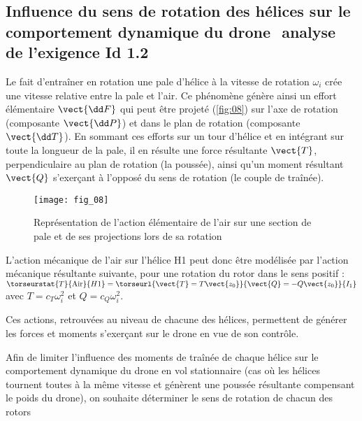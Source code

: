 \ifprof
\begin{corrige}
\end{corrige}
\else
\fi

\subsection{Influence du sens de rotation des hélices sur le comportement dynamique du
drone ­ analyse de l’exigence Id 1.2}

Le fait d’entraîner en rotation une pale d’hélice à la vitesse de rotation $\omega_i$ crée une vitesse
relative entre la pale et l’air. Ce phénomène génère ainsi un effort élémentaire $\vect{\dd F}$ qui peut
être projeté (\autoref{fig:08}) sur l’axe de rotation (composante $\vect{\dd P}$) et dans le plan de rotation (composante $\vect{\dd T}$).
En sommant ces efforts sur un tour d’hélice et en intégrant sur toute la longueur de la pale,
il en résulte une force résultante $\vect{T}$, perpendiculaire au plan de rotation (la poussée), ainsi
qu’un moment résultant $\vect{Q}$ s’exerçant à l’opposé du sens de rotation (le couple de traînée).


\begin{figure}[H]
\centering
\texttt{[image: fig\_08]}
\caption{\label{fig:08}  Représentation de l’action élémentaire de l’air sur une section de pale et de ses
projections lors de sa rotation}
\end{figure}

L’action mécanique de l’air sur l’hélice H1 peut donc être modélisée par l’action mécanique
résultante suivante, pour une rotation du rotor dans le sens positif : 
$\torseurstat{T}{\text{Air}}{H1} = \torseurl{\vect{T}=T\vect{z_0}}{\vect{Q}=-Q\vect{z_0}}{I_1}$
avec $T = c_T \omega_i^2$ et $Q=c_Q \omega_i^2$.


Ces actions, retrouvées au niveau de chacune des hélices, permettent de générer les forces
et moments s’exerçant sur le drone en vue de son contrôle.

Afin de limiter l’influence des moments de traînée de chaque hélice sur le comportement
dynamique du drone en vol stationnaire (cas où les hélices tournent toutes à la même vitesse
et génèrent une poussée résultante compensant le poids du drone), on souhaite déterminer
le sens de rotation de chacun des rotors


